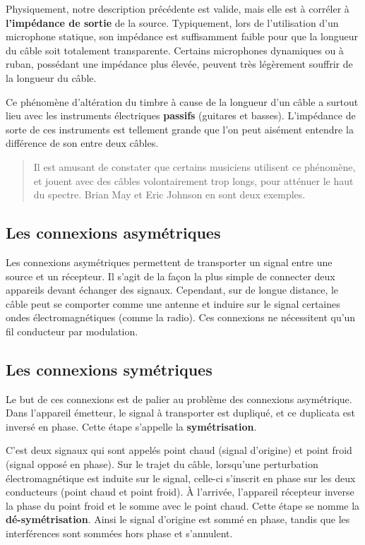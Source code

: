 \documentclass[
]{book}
\begin{document}
Physiquement, notre description précédente est valide, mais elle est à corréler à \textbf{l'impédance de sortie} de la source. Typiquement, lors de l'utilisation d'un microphone statique, son impédance est suffisamment faible pour que la longueur du câble soit totalement transparente. Certains microphones dynamiques ou à ruban, possédant une impédance plus élevée, peuvent très légèrement souffrir de la longueur du câble.

Ce phénomène d'altération du timbre à cause de la longueur d'un câble a surtout lieu avec les instruments électriques \textbf{passifs} (guitares et basses). L'impédance de sorte de ces instruments est tellement grande que l'on peut aisément entendre la différence de son entre deux câbles.

\begin{quote}
Il est amusant de constater que certains musiciens utilisent ce phénomène, et jouent avec des câbles volontairement trop longs, pour atténuer le haut du spectre. Brian May et Eric Johnson en sont deux exemples.
\end{quote}

\hypertarget{les-connexions-asymuxe9triques}{%
\subsection{Les connexions asymétriques}\label{les-connexions-asymuxe9triques}}

Les connexions asymétriques permettent de transporter un signal entre une source et un récepteur. Il s'agit de la façon la plus simple de connecter deux appareils devant échanger des signaux. Cependant, sur de longue distance, le câble peut se comporter comme une antenne et induire sur le signal certaines ondes électromagnétiques (comme la radio). Ces connexions ne nécessitent qu'un fil conducteur par modulation.

\hypertarget{les-connexions-symuxe9triques}{%
\subsection{Les connexions symétriques}\label{les-connexions-symuxe9triques}}

Le but de ces connexions est de palier au problème des connexions asymétrique. Dans l'appareil émetteur, le signal à transporter est dupliqué, et ce duplicata est inversé en phase. Cette étape s'appelle la \textbf{symétrisation}.

C'est deux signaux qui sont appelés point chaud (signal d'origine) et point froid (signal opposé en phase). Sur le trajet du câble, lorsqu'une perturbation électromagnétique est induite sur le signal, celle-ci s'inscrit en phase sur les deux conducteurs (point chaud et point froid). À l'arrivée, l'appareil récepteur inverse la phase du point froid et le somme avec le point chaud. Cette étape se nomme la \textbf{dé-symétrisation}. Ainsi le signal d'origine est sommé en phase, tandis que les interférences sont sommées hors phase et s'annulent.
\end{document}
